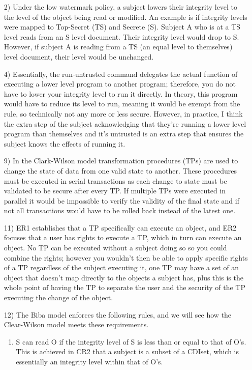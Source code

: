 \documentclass[journal,onecolumn]{IEEEtran}
\begin{document}
\begin{enumerate}
  \item [2)] Under the low watermark policy, a subject lowers their integrity level to the level of the object being read or modified. An example is if integrity levels were mapped to Top-Secret (TS) and Secrete (S). Subject A who is at a TS level reads from an S level document. Their integrity level would drop to S. However, if subject A is reading from a TS (an equal level to themselves) level document, their level would be unchanged.
  \item [4)] Essentially, the run-untrusted command delegates the actual function of executing a lower level program to another program; therefore, you do not have to lower your integrity level to run it directly. In theory, this program would have to reduce its level to run, meaning it would be exempt from the rule, so technically not any more or less secure. However, in practice, I think the extra step of the subject acknowledging that they're running a lower level program than themselves and it's untrusted is an extra step that ensures the subject knows the effects of running it. 
  \item [9)] In the Clark-Wilson model transformation procedures (TPs) are used to change the state of data from one valid state to another. These procedures must be executed in serial transactions as each change to state must be validated to be secure after every TP. If multiple TPs were executed in parallel it would be impossible to verify the validity of the final state and if not all transactions would have to be rolled back instead of the latest one. 
  \item [11)] ER1 establishes that a TP specifically can execute an object, and ER2 focuses that a user has rights to execute a TP, which in turn can execute an object. No TP can be executed without a subject doing so so you could combine the rights; however you wouldn't then be able to apply specific rights of a TP regardless of the subject executing it, one TP may have a set of an object that doesn't map directly to the objects a subject has, plus this is the whole point of having the TP to separate the user and the security of the TP executing the change of the object.
  \item [12)] The Biba model enforces the following rules, and we will see how the Clear-Wilson model meets these requirements.
  \begin{enumerate}
    \item S can read O if the integrity level of S is less than or equal to that of O's. This is achieved in CR2 that a subject is a subset of a CDIset, which is essentially an integrity level within that of O's. 

\end{enumerate}
\end{enumerate}
\end{document}
